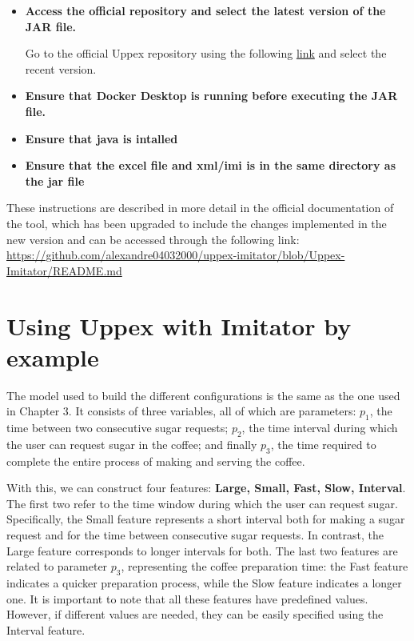 \begin{itemize}
    \item \textbf{Access the official repository and select the latest version of the JAR file.}

    Go to the official Uppex repository using the following \href{https://github.com/alexandre04032000/uppex-imitator/releases}{link} and select the recent version.

    \item \textbf{Ensure that Docker Desktop is running before executing the JAR file.}

    \item \textbf{Ensure that java is intalled}

    \item \textbf{Ensure that the excel file and xml/imi is in the same directory as the jar file}
\end{itemize}

These instructions are described in more detail in the official documentation of the tool, which has been upgraded to include the changes implemented in the new version and can be accessed through the following link: \url{https://github.com/alexandre04032000/uppex-imitator/blob/Uppex-Imitator/README.md}
\section{Using Uppex with Imitator by example}

The model used to build the different configurations is the same as the one used in Chapter 3. It consists of three variables, all of which are parameters: $p_1$, the time between two consecutive sugar requests; $p_2$, the time interval during which the user can request sugar in the coffee; and finally $p_3$, the time required to complete the entire process of making and serving the coffee.

With this, we can construct four features: \textbf{Large, Small, Fast, Slow, Interval}. The first two refer to the time window during which the user can request sugar. Specifically, the Small feature represents a short interval both for making a sugar request and for the time between consecutive sugar requests. In contrast, the Large feature corresponds to longer intervals for both. The last two features are related to parameter $p_3$, representing the coffee preparation time: the Fast feature indicates a quicker preparation process, while the Slow feature indicates a longer one. It is important to note that all these features have predefined values. However, if different values are needed, they can be easily specified using the Interval feature.

